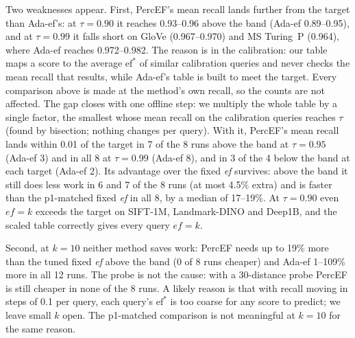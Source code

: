 \documentclass[sigconf,review=false,screen]{acmart}
\newcommand{\ef}{\textit{ef}}
\begin{document}
Two weaknesses appear. First, PercEF's mean recall lands further from the target than Ada-ef's:
at $\tau = 0.90$ it reaches 0.93--0.96 above the band (Ada-ef 0.89--0.95), and at $\tau = 0.99$ it
falls short on GloVe (0.967--0.970) and MS Turing~P (0.964), where Ada-ef reaches 0.972--0.982. The
reason is in the calibration: our table maps a score to the average $\mathrm{ef}^*$ of similar
calibration queries and never checks the mean recall that results, while Ada-ef's table is built to
meet the target. Every comparison above is made at the method's own recall, so the counts are not
affected. The gap closes with one offline step: we multiply the whole table by a single factor, the
smallest whose mean recall on the calibration queries reaches $\tau$ (found by bisection; nothing
changes per query). With it, PercEF's mean recall lands within 0.01 of the target in 7 of the 8 runs
above the band at $\tau = 0.95$ (Ada-ef 3) and in all 8 at $\tau = 0.99$ (Ada-ef 8), and in 3 of the 4
below the band at each target (Ada-ef 2). Its advantage over the fixed \ef{} survives: above the
band it still does less work in 6 and 7 of the 8 runs (at most 4.5\% extra) and is faster than the
p1-matched fixed \ef{} in all 8, by a median of 17--19\%. At $\tau = 0.90$ even $\mathit{ef} = k$
exceeds the target on SIFT-1M, Landmark-DINO and Deep1B, and the scaled table correctly gives every
query $\mathit{ef} = k$.

Second, at $k = 10$ neither method saves work: PercEF needs up to 19\% more than the tuned fixed
\ef{} above the band (0 of 8 runs cheaper) and Ada-ef 1--109\% more in all 12 runs. The probe is not
the cause: with a 30-distance probe PercEF is still cheaper in none of the 8 runs. A likely reason is
that with recall moving in steps of 0.1 per query, each query's $\mathrm{ef}^*$ is too coarse for any
score to predict; we leave small $k$ open. The p1-matched comparison is not meaningful at $k = 10$
for the same reason.
\end{document}
